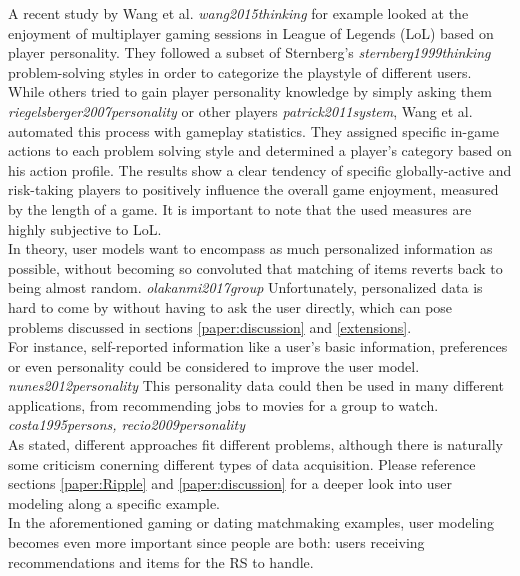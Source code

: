 \documentclass[nochapterpage,bigchapter,linedtoc,longdoc,colorback,accentcolor=tud3b,oneside]{tudreport}
\begin{document}
A recent study by Wang et al. \textit{wang2015thinking} for example looked at the enjoyment of multiplayer gaming sessions in League of Legends (LoL) based on player personality. They followed a subset of Sternberg's \textit{sternberg1999thinking} problem-solving styles in order to categorize the playstyle of different users. While others tried to gain player personality knowledge by simply asking them \textit{riegelsberger2007personality} or other players \textit{patrick2011system}, Wang et al. automated this process with gameplay statistics. They assigned specific in-game actions to each problem solving style and determined a player's category based on his action profile. The results show a clear tendency of specific globally-active and risk-taking players to positively influence the overall game enjoyment, measured by the length of a game. It is important to note that the used measures are highly subjective to LoL.\\
In theory, user models want to encompass as much personalized information as possible, without becoming so convoluted that matching of items reverts back to being almost random. \textit{olakanmi2017group} Unfortunately, personalized data is hard to come by without having to ask the user directly, which can pose problems discussed in sections \ref{paper:discussion} and \ref{extensions}.\\
For instance, self-reported information like a user's basic information, preferences or even personality could be considered to improve the user model. \textit{nunes2012personality} This personality data could then be used in many different applications, from recommending jobs to movies for a group to watch. \textit{costa1995persons, recio2009personality}\\
As stated, different approaches fit different problems, although there is naturally some criticism conerning different types of data acquisition. Please reference sections \ref{paper:Ripple} and \ref{paper:discussion} for a deeper look into user modeling along a specific example.\\
In the aforementioned gaming or dating matchmaking examples, user modeling becomes even more important since people are both: users receiving recommendations and items for the RS to handle.\\
\end{document}
